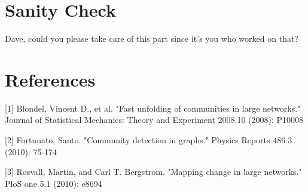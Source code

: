 \documentclass[12pt]{article}
\begin{document}
\section{Sanity Check}
Dave, could you please take care of this part since it's you who worked on that?

\section{References}
[1] Blondel, Vincent D., et al. "Fast unfolding of communities in large networks." Journal of Statistical Mechanics: Theory and Experiment 2008.10 (2008): P10008

[2] Fortunato, Santo. "Community detection in graphs." Physics Reports 486.3 (2010): 75-174

[3] Rosvall, Martin, and Carl T. Bergstrom. "Mapping change in large networks." PloS one 5.1 (2010): e8694
\end{document}
